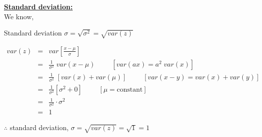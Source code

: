 \documentclass{article}
\begin{document}
{    \newpage
    \textbf{\underline{Standard deviation:}}\\
    We know,

    \hspace{4em}Standard deviation $\sigma = \sqrt{\sigma^2} = \sqrt{var(z)}$

    \begin{eqnarray*}
        var(z) &=& var\left[\frac{x-\mu}{\sigma}\right]\\
        &=& \frac{1}{\sigma^2}\;var(x-\mu)\hspace{1cm}\left[var(ax) = a^2\;var(x)\right]\\
        &=& \frac{1}{\sigma^2}\;\left[var(x) + var(\mu)\right]\hspace{1cm}[var(x-y) = var(x)+var(y)]\\
        &=& \frac{1}{\sigma^2}[\sigma^2 + 0]\hspace{1cm}[\mu = \text{constant}]\\
        &=& \frac{1}{\sigma^2}\cdot \sigma^2\\
        &=& 1
    \end{eqnarray*}

    $\therefore$ standard deviation, $\sigma = \sqrt{var(z)} = \sqrt{1} = 1$
    
}

\section{}
\end{document}
